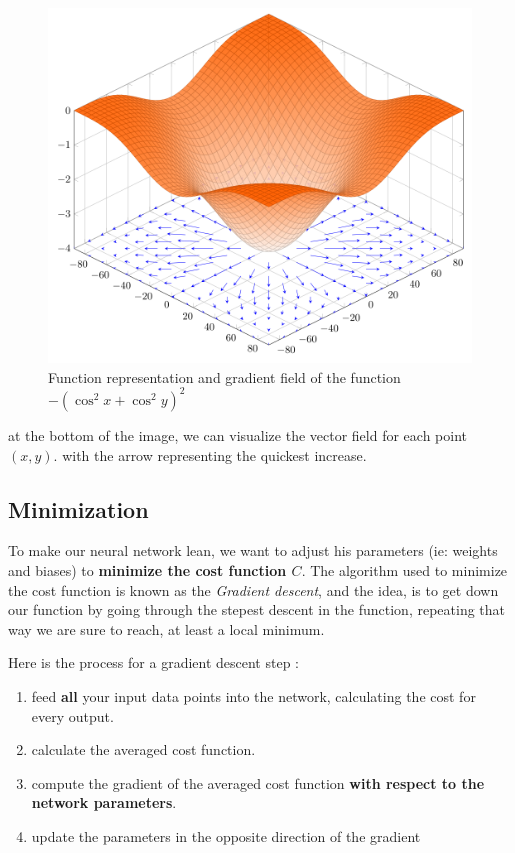\documentclass[a4paper, twocolumn, twoside]{article}
\begin{document}
	\begin{figure}
		\begin{center}
			\includegraphics[width=\columnwidth]{images/gradient_2d.png}
		\end{center}
		\caption{Function representation and gradient field of the function $-(\cos^2 x  +\cos^2 y)^2$}\label{fig:gradien2d}
	\end{figure}

	at the bottom of the image, we can visualize the vector field for each point $(x, y)$. with the arrow representing the quickest increase.
	
	\subsection{Minimization}
	To make our neural network lean, we want to adjust his parameters (ie: weights and biases) to \textbf{minimize the cost function $C$}.
	The algorithm used to minimize the cost function is known as the \textit{Gradient descent}, and the idea, is to get down our function by going through the stepest descent
	in the function, repeating that way we are sure to reach, at least a local minimum.

	Here is the process for a gradient descent step :
	\begin{enumerate}
		\item feed \textbf{all} your input data points into the network, calculating the cost for every output.
		\item calculate the averaged cost function.
		\item compute the gradient of the averaged cost function \textbf{with respect to the network parameters}.
		\item update the parameters in the opposite direction of the gradient
	\end{enumerate}
\end{document}
